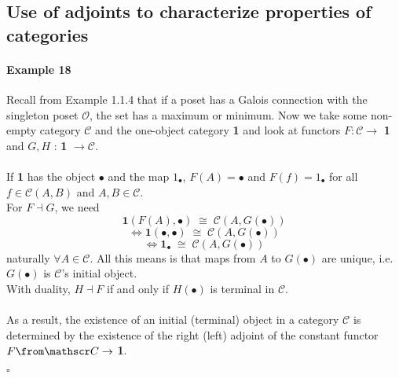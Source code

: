 \subsection*{Use of adjoints to characterize properties of categories}

\paragraph{Example 18} 
	Recall from Example 1.1.4 that if a poset has a Galois connection with the singleton poset $\mathcal{O}$, the set has a maximum or minimum. Now we take some non-empty category $\mathscr C$ and the one-object category \textbf{1} and look at functors $F:  \mathscr C \to$ \textbf{1} and
	$G,H$ : \textbf{1} $\to \mathscr C $. \\\\
	If \textbf{1} has the object $\bullet$ and the map $1{_\bullet}$, $F(A) = \bullet$ and $F(f) = 1{_\bullet}$ for all $f \in \mathscr C (A, B)$ and $A, B \in \mathscr C $.
	 \\ For $F \dashv G$, we need \[\textbf{1}(F(A), \bullet) \; \cong \;  \mathscr C (A, G(\bullet))\]
	 \[\Leftrightarrow \textbf{1}(\bullet, \bullet) \; \cong \;  \mathscr C (A, G(\bullet))  \]
	 \[\Leftrightarrow \textbf{1}_\bullet \; \cong \;  \mathscr C (A, G(\bullet))  \]
	naturally $\forall A \in\mathscr C $. All this means is that maps from $A$ to $G(\bullet)$ are unique, i.e. $G(\bullet)$ is $\mathscr C $'s initial object.	
	\\With duality, $H \dashv F$ if and only if $H(\bullet)$ is terminal in $\mathscr C $.
	\\\\As a result, the existence of an initial (terminal) object in a category $\mathscr C$ is determined by the existence of the right (left) adjoint of the constant functor $F \from \mathscr C \to$ \textbf{1}. {\begin{flushright}$\square$\end{flushright}}
	\vspace{\baselineskip}
	\vspace{\baselineskip}
